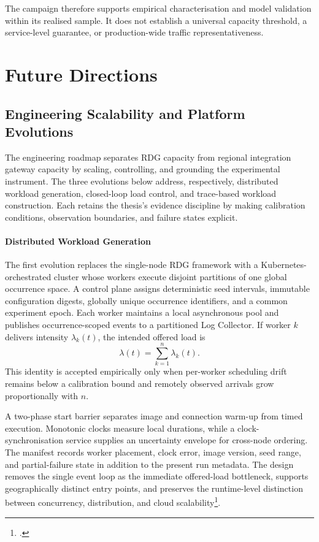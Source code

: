 \noindent The campaign therefore supports empirical characterisation and model
validation within its realised sample. It does not establish a universal
capacity threshold, a service-level guarantee, or production-wide traffic
representativeness.

\section{Future Directions}
\label{sec:conclusions-future-work}

\subsection{Engineering Scalability and Platform Evolutions}
\label{subsec:future-engineering-scalability}

\noindent The engineering roadmap separates RDG capacity from regional integration gateway
capacity by scaling, controlling, and grounding the experimental instrument.
The three evolutions below address, respectively, distributed workload
generation, closed-loop load control, and trace-based workload construction.
Each retains the thesis's evidence discipline by making calibration conditions,
observation boundaries, and failure states explicit.

\paragraph{Distributed Workload Generation}
\noindent The first evolution replaces the single-node RDG framework with a
Kubernetes-orchestrated cluster whose workers execute disjoint
partitions of one global occurrence space. A control plane assigns deterministic
seed intervals, immutable configuration digests, globally unique occurrence
identifiers, and a common experiment epoch. Each worker maintains a local
asynchronous pool and publishes occurrence-scoped events to a partitioned
Log Collector. If worker $k$ delivers intensity $\lambda_k(t)$, the intended offered
load is
\[
    \lambda(t)=\sum_{k=1}^{n}\lambda_k(t).
\]
This identity is accepted empirically only when per-worker scheduling drift
remains below a calibration bound and remotely observed arrivals grow
proportionally with $n$.

\noindent A two-phase start barrier separates image and connection warm-up from
timed execution. Monotonic clocks measure local durations, while a
clock-synchronisation service supplies an uncertainty envelope for cross-node
ordering. The manifest records worker placement, clock error, image version,
seed range, and partial-failure state in addition to the present run metadata.
The design removes the single event loop as the immediate offered-load
bottleneck, supports geographically distinct entry points, and preserves the
runtime-level distinction between concurrency, distribution, and cloud
scalability\footcites{unipd-runtimes-concurrency-syllabus}
{apache-jmeter-remote-testing}.

